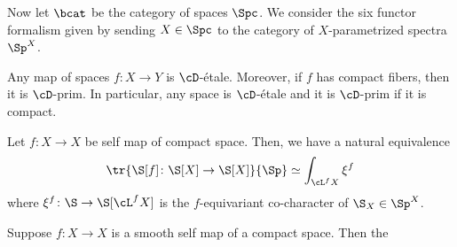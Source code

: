 Now let $\bcat$ be the category of spaces $\Spc$. We consider the six functor formalism
given by sending $X\in \Spc$ to the category of $X$-parametrized spectra $\Sp^{X}$.

\begin{prop}
  Any map of spaces $f\colon X\to Y$ is $\cD$-\'etale. Moreover, if $f$ has compact fibers, then
  it is $\cD$-prim. In particular, any space is $\cD$-\'etale and it is $\cD$-prim
  if it is compact.
\end{prop}

\begin{prop}
  Let $f\colon X \to X$ be self map of compact space. Then, we have a natural equivalence
  \[ \tr{\S[f]\colon \S[X]\to \S[X]}{\Sp} \simeq \int_{\cL^{f} X} \xi^{f}\]
  where $\xi^{f}\colon \S\to \S[\cL^{f} X]$ is the $f$-equivariant co-character of $\S_{X}\in \Sp^{X}$.
\end{prop}

\begin{prop}
Suppose $f\colon X\to X$ is a smooth self map of a compact space. Then the
\end{prop}





